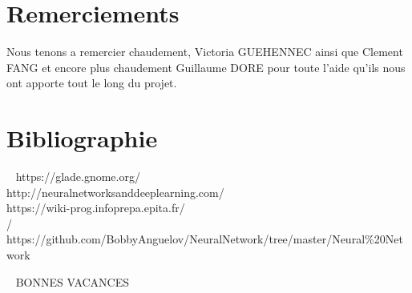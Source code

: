\documentclass[14pt]{article}
\begin{document}
\section{Remerciements}
Nous tenons a remercier chaudement, Victoria GUEHENNEC ainsi que Clement FANG et encore plus chaudement Guillaume DORE pour toute l'aide qu'ils nous ont apporte tout le long du projet.
\newpage
\section{Bibliographie}
\ \newline
https://glade.gnome.org/ \newline
\\
http://neuralnetworksanddeeplearning.com/ \newline
\\
https://wiki-prog.infoprepa.epita.fr/ \newline
\\/
https://github.com/BobbyAnguelov/NeuralNetwork/tree/master/Neural\%20Network
\newpage
\begin{center}

\  \newline
\newline
\newline
\newline
\newline
\Huge BONNES VACANCES
\end{center}
\end{document}
